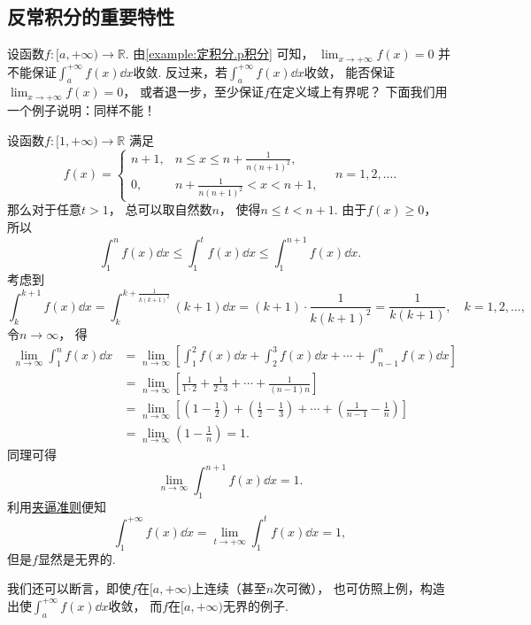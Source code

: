 \subsection{反常积分的重要特性}
设函数\(f\colon[a,+\infty)\to\mathbb{R}\).
由\cref{example:定积分.p积分} 可知，
\(\lim_{x\to+\infty} f(x) = 0\)
并不能保证\(\int_a^{+\infty} f(x) \dd{x}\)收敛.
反过来，若\(\int_a^{+\infty} f(x) \dd{x}\)收敛，
能否保证\(\lim_{x\to+\infty} f(x) = 0\)，
或者退一步，至少保证\(f\)在定义域上有界呢？
下面我们用一个例子说明：同样不能！
\begin{example}
设函数\(f\colon[1,+\infty)\to\mathbb{R}\)
满足\begin{equation*}
	f(x) = \left\{ \begin{array}{cl}
		n+1, & n \leq x \leq n+\frac1{n(n+1)^2}, \\
		0, & n+\frac1{n(n+1)^2} < x < n+1,
	\end{array} \right.
	\quad n=1,2,\dotsc.
\end{equation*}
那么对于任意\(t>1\)，
总可以取自然数\(n\)，
使得\(n \leq t < n+1\).
由于\(f(x)\geq0\)，
所以\begin{equation*}
	\int_1^n f(x) \dd{x}
	\leq \int_1^t f(x) \dd{x}
	\leq \int_1^{n+1} f(x) \dd{x}.
\end{equation*}
考虑到\begin{equation*}
	\int_k^{k+1} f(x) \dd{x}
	= \int_k^{k+\frac1{k(k+1)^2}} (k+1) \dd{x}
	= (k+1) \cdot \frac1{k(k+1)^2}
	= \frac1{k(k+1)},
	\quad k=1,2,\dotsc,
\end{equation*}
令\(n\to\infty\)，
得\begin{align*}
	\lim_{n\to\infty} \int_1^n f(x) \dd{x}
	&= \lim_{n\to\infty} \left[
		\int_1^2 f(x) \dd{x}
		+ \int_2^3 f(x) \dd{x}
		+ \dotsb
		+ \int_{n-1}^n f(x) \dd{x}
	\right] \\
	&= \lim_{n\to\infty} \left[
		\frac1{1\cdot2}
		+ \frac1{2\cdot3}
		+ \dotsb
		+ \frac1{(n-1)n}
	\right] \\
	&= \lim_{n\to\infty} \left[
		\left(1-\frac12\right)
		+ \left(\frac12-\frac13\right)
		+ \dotsb
		+ \left(\frac1{n-1}-\frac1n\right)
	\right] \\
	&= \lim_{n\to\infty} \left(1-\frac1n\right)
	= 1.
\end{align*}
同理可得\begin{equation*}
	\lim_{n\to\infty} \int_1^{n+1} f(x) \dd{x} = 1.
\end{equation*}
利用\hyperref[theorem:数列极限.夹逼准则]{夹逼准则}便知\begin{equation*}
	\int_1^{+\infty} f(x) \dd{x}
	= \lim_{t\to+\infty} \int_1^t f(x) \dd{x}
	= 1,
\end{equation*}
但是\(f\)显然是无界的.
\end{example}
我们还可以断言，即使\(f\)在\([a,+\infty)\)上连续（甚至\(n\)次可微），
也可仿照上例，构造出使\(\int_a^{+\infty} f(x) \dd{x}\)收敛，
而\(f\)在\([a,+\infty)\)无界的例子.

